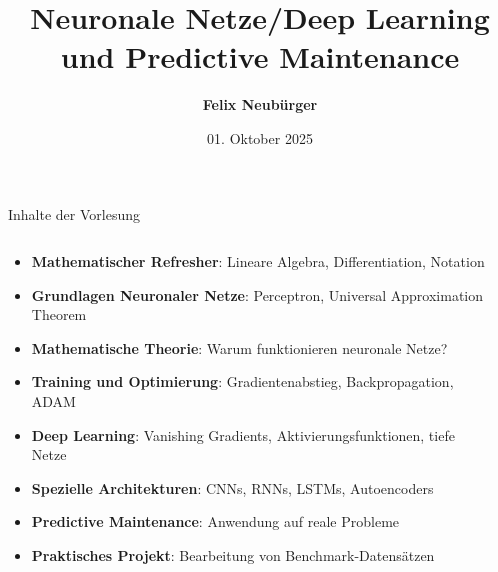 \documentclass[aspectratio=1610, xcolor=dvipsnames, 9pt]{beamer}
\title{Neuronale Netze/Deep Learning und Predictive Maintenance}
\author[F.~Neubürger,]{ \textbf{Felix Neubürger}}
\institute[I \& W]{Fachhochschule Südwestfalen, Ingenieurs- \& Wirtschaftswissenschaften}
\date{01. Oktober 2025}
\begin{document}
\begin{frame}{Inhalte der Vorlesung}
  \begin{columns}
    \begin{column}{1\textwidth}
      \begin{itemize}
        \item \textbf{Mathematischer Refresher}: Lineare Algebra, Differentiation, Notation \newline
        \item \textbf{Grundlagen Neuronaler Netze}: Perceptron, Universal Approximation Theorem \newline
        \item \textbf{Mathematische Theorie}: Warum funktionieren neuronale Netze? \newline
        \item \textbf{Training und Optimierung}: Gradientenabstieg, Backpropagation, ADAM \newline
        \item \textbf{Deep Learning}: Vanishing Gradients, Aktivierungsfunktionen, tiefe Netze \newline
        \item \textbf{Spezielle Architekturen}: CNNs, RNNs, LSTMs, Autoencoders \newline
        \item \textbf{Predictive Maintenance}: Anwendung auf reale Probleme \newline
        \item \textbf{Praktisches Projekt}: Bearbeitung von Benchmark-Datensätzen
      \end{itemize}
    \end{column}
    \begin{column}{0\textwidth}
    \end{column}
  \end{columns}
\end{frame}
\end{document}
